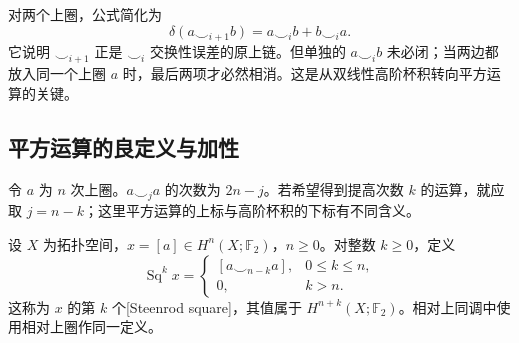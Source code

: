 对两个上圈，公式简化为
\[
	\delta(a\smile_{i+1}b)=a\smile_i b+b\smile_i a.
\]
它说明 \(\smile_{i+1}\) 正是 \(\smile_i\) 交换性误差的原上链。但单独的 \(a\smile_i b\) 未必闭；当两边都放入同一个上圈 \(a\) 时，最后两项才必然相消。这是从双线性高阶杯积转向平方运算的关键。

\subsection{平方运算的良定义与加性}
\label{g2:subsec:1302:03}

令 \(a\) 为 \(n\) 次上圈。\(a\smile_j a\) 的次数为 \(2n-j\)。若希望得到提高次数 \(k\) 的运算，就应取 \(j=n-k\)；这里平方运算的上标与高阶杯积的下标有不同含义。

\begin{definition}[Steenrod 平方]\label{g2:def:steenrod-square}
	设 \(X\) 为拓扑空间，\(x=[a]\in H^n(X;\mathbb F_2)\)，\(n\ge0\)。对整数 \(k\ge0\)，定义
	\begin{equation}\label{g2:eq:steenrod-cup-i-definition}
		\operatorname{Sq}^k x=
		\begin{cases}
			[a\smile_{n-k}a],&0\le k\le n,\\
			0,&k>n.
		\end{cases}
	\end{equation}
	这称为 \(x\) 的第 \(k\) 个[Steenrod square]，其值属于 \(H^{n+k}(X;\mathbb F_2)\)。相对上同调中使用相对上圈作同一定义。
\end{definition}


